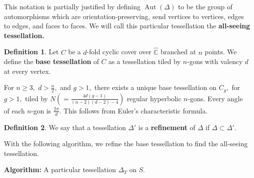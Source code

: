 \documentclass[12pt,reqno]{amsart}
\DeclareMathOperator{\Aut}{Aut}
\newcommand{\C}{\mathbb{C}}
\theoremstyle{definition}
\newtheorem{defn}{Definition}
\theoremstyle{remark}
\newcommand{\DD}{\Delta\kern -8.3pt {\diamond} \kern -4.5pt \cdot \:}
\begin{document}
This notation is partially justified by defining $\Aut(\Delta)$ to be the group of automorphisms which are orientation-preserving, send vertices to vertices, edges to edges, and faces to faces. We will call this particular tessellation the \textbf{all-seeing tessellation.} 

\begin{defn} \label{defn: base tess} Let $C$ be a $d$-fold cyclic cover over $\widehat{\C}$ branched at $n$ points. We define the \textbf{base tessellation} of $C$ as a tessellation tiled by $n$-gons with valency $d$ at every vertex. \end{defn}

For $n \geq 3,$ $d > \frac{n}{2},$ and $g > 1,$ there exists a unique base tessellation on $C_g,$ for $g > 1,$ tiled by $N (= \frac{4 d (g - 1)}{(n - 2) (d - 2) - 4})$ regular hyperbolic $n$-gons. Every angle of each $n$-gon is $\frac{2 \pi}{d}.$ This follows from Euler's characteristic formula.

\begin{defn} We say that a tessellation $\Delta'$ is a \textbf{refinement} of $\Delta$ if $\Delta \subset \Delta'$. \end{defn}

With the following algorithm, we refine the base tessellation to find the all-seeing tessellation. 



\textbf{Algorithm:} A particular tessellation $\Delta_T$ on $S$.


\end{document}
